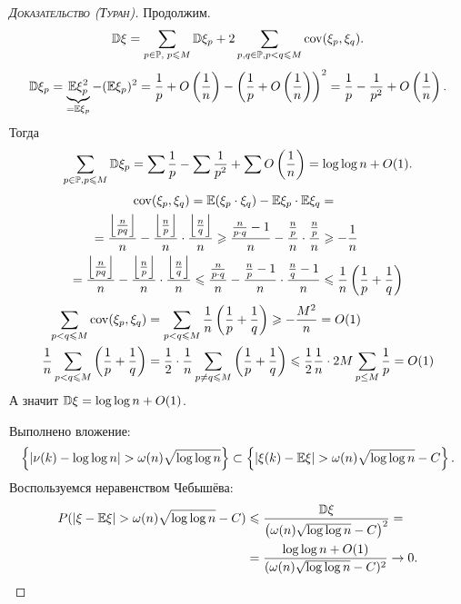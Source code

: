 \documentclass[../main.tex]{subfiles}
\begin{document}
\begin{proof}[\normalfont\textsc{Доказательство (Туран)}]
 Продолжим.
 \begin{align*}
  \mathbb D\xi = \sum_{p \in \mathbb P,\; p \leqslant M} \mathbb D\xi_p + 2 \sum_{p,q \in \mathbb P,p < q \leqslant M} \mathrm{cov}(\xi_p,\xi_q).
 \end{align*}
 \begin{align*}
	 \mathbb D\xi_p = \underbrace{\mathbb E\xi_p^{2}}_{=\mathbb E \xi_p} - (\mathbb E\xi_p)^{2} = \frac{1}{p} + O \left( \frac{1}{n} \right) - \left(\frac{1}{p} + O\left(\frac{1}{n}\right)\right)^{2} = \frac{1}{p} - \frac{1}{p^{2}} + O \left( \frac{1}{n} \right).
 \end{align*} Тогда
 \begin{align*}
  \sum_{p \in \mathbb P, p \leqslant M} \mathbb D\xi_p = \sum \frac{1}{p} - \sum \frac{1}{p^{2}} + \sum O \left( \frac{1}{n} \right) = \log\log n + O(1).
 \end{align*}
 \begin{align*}
	 \mathrm{cov}(\xi_p, \xi_q) = \mathbb E(\xi_p \cdot \xi_q) - \mathbb E\xi_p \cdot \mathbb E\xi_q &= \\
  = \frac{\left\lfloor \frac{n}{pq} \right\rfloor }{n} - \frac{\left\lfloor \frac{n}{p} \right\rfloor}{n} \cdot \frac{\left\lfloor \frac{n}{q} \right\rfloor }{n} \geqslant \frac{\frac{n}{p \cdot q} - 1}{n} - \frac{\frac{n}{p }}{n } \cdot \frac{\frac{n}{p }}{n} &\geqslant -\frac{1}{n} \\
  = \frac{\left\lfloor \frac{n}{pq} \right\rfloor }{n} - \frac{\left\lfloor \frac{n}{p} \right\rfloor}{n} \cdot \frac{\left\lfloor \frac{n}{q} \right\rfloor }{n} \leqslant \frac{\frac{n}{p \cdot q}}{n} - \frac{\frac{n}{p} - 1}{n} \cdot \frac{\frac{n}{q} - 1}{n} &\leqslant \frac{1}{n} \left(\frac{1}{p} + \frac{1}{q}\right)
 \end{align*} 
 \begin{align*}
	 \sum_{p < q \leqslant M} \mathrm{cov}(\xi_p, \xi_q) &= \sum_{p < q \leqslant M} \frac 1 n \left(\frac 1 p + \frac 1 q\right) \geqslant -\frac{M^2}{n} = O(1) \\
	 \frac 1 n \sum_{p < q \leqslant M} \left(\frac 1 p + \frac 1 q\right) &= \frac 1 2 \cdot \frac 1 n \sum_{p \neq q \leqslant M} \left(\frac 1 p + \frac 1 q\right) \leqslant \frac 1 2 \frac 1 n \cdot 2M \sum_{p \leq M} \frac 1 p = O(1)
 \end{align*}
  А значит $ \mathbb D\xi = \log\log n + O(1) $.

  Выполнено вложение:
  \begin{align*}
   \left\{\left| \nu(k) - \log\log n \right| > \omega(n) \sqrt{\log\log n} \right\} \subset \left\{ \left|\xi(k) - \mathbb E\xi \right| > \omega(n)\sqrt{\log\log n} - C \right\}.
  \end{align*} Воспользуемся неравенством Чебышёва:
  \begin{align*}
	P( \left| \xi - \mathbb E\xi \right| > \omega(n)\sqrt{\log\log n} - C) &\leqslant \frac{\mathbb D\xi}{\left( \omega(n)\sqrt{\log \log n} - C \right)^{2}} = \\
   &= \frac{\log\log n + O(1)}{(\omega(n)\sqrt{\log \log n} - C)^{2}} \to 0.
  \end{align*} 
\end{proof}
\end{document}
